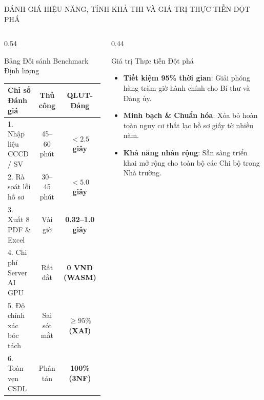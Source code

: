 \documentclass[aspectratio=169, 10pt]{beamer}
\begin{document}
\begin{frame}{ĐÁNH GIÁ HIỆU NĂNG, TÍNH KHẢ THI VÀ GIÁ TRỊ THỰC TIỄN ĐỘT PHÁ}
  \begin{columns}[T]
    \begin{column}{0.54\textwidth}
      \begin{greenCard}{Bảng Đối sánh Benchmark Định lượng}
        \fontsize{6.2pt}{7.6pt}\selectfont
        \begin{tabularx}{\linewidth}{Xcc}
          \toprule
          \textbf{Chỉ số Đánh giá} & \textbf{Thủ công} & \textbf{QLUT-Đảng}        \\
          \midrule
          1. Nhập liệu CCCD / SV   & 45--60 phút       & \textbf{$<2.5$ giây}      \\
          2. Rà soát lỗi hồ sơ     & 30--45 phút       & \textbf{$<5.0$ giây}      \\
          3. Xuất 8 PDF \& Excel   & Vài giờ           & \textbf{0.32--1.0 giây}   \\
          4. Chi phí Server AI GPU & Rất đắt           & \textbf{0 VNĐ (WASM)}     \\
          5. Độ chính xác bóc tách & Sai sót mắt       & \textbf{$\ge 95\%$ (XAI)} \\
          6. Toàn vẹn CSDL         & Phân tán          & \textbf{100\% (3NF)}      \\
          \bottomrule
        \end{tabularx}
      \end{greenCard}
    \end{column}
    \begin{column}{0.44\textwidth}
      \begin{highlightCard}{Giá trị Thực tiễn Đột phá}
        \fontsize{6.6pt}{8.2pt}\selectfont
        \begin{itemize}
          \setlength{\itemsep}{1.2pt}
          \item \textbf{Tiết kiệm 95\% thời gian}: Giải phóng hàng trăm giờ hành chính cho Bí thư và Đảng ủy.
          \item \textbf{Minh bạch \& Chuẩn hóa}: Xóa bỏ hoàn toàn nguy cơ thất lạc hồ sơ giấy tờ nhiều năm.
          \item \textbf{Khả năng nhân rộng}: Sẵn sàng triển khai mở rộng cho toàn bộ các Chi bộ trong Nhà trường.
        \end{itemize}
      \end{highlightCard}
    \end{column}
  \end{columns}
\end{frame}
\end{document}
